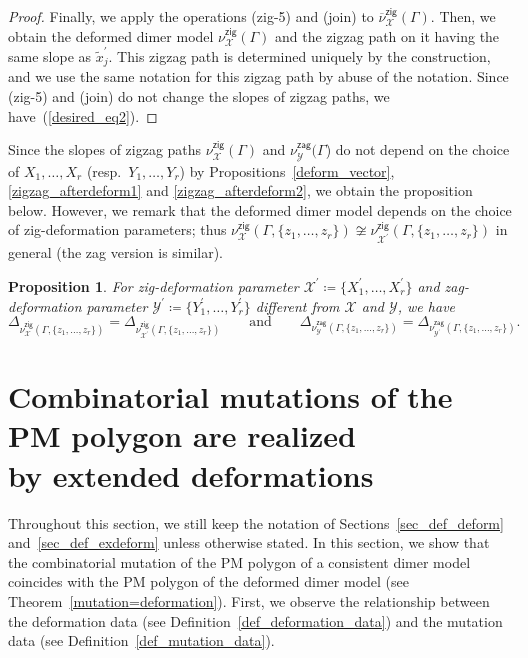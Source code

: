 \documentclass[11pt]{article}
\numberwithin{equation}{section}
\numberwithin{equation}{section}
\numberwithin{figure}{section}
\numberwithin{table}{section}
\newtheorem{Proposition}[Theorem]{Proposition}
 { \theoremstyle{definition}
\newtheorem{Definition}[Theorem]{Definition}
\newtheorem{Note}[Theorem]{Note}
\newtheorem{Example}[Theorem]{Example}
\newtheorem{Remark}[Theorem]{Remark}
\newtheorem{observation}[Theorem]{Observation}
\newtheorem{operation}[Theorem]{Operation}
\newtheorem{setting}[Theorem]{Setting}}
\newcommand{\calX}{\mathcal{X}}
\newcommand{\calY}{\mathcal{Y}}
\newcommand{\zig}{\mathsf{zig}}
\newcommand{\zag}{\mathsf{zag}}
\begin{document}
\begin{proof}
Finally, we apply the operations (zig-5) and (join) to $\overline{\nu}_\calX^\zig(\Gamma)$.
Then, we obtain the deformed dimer model $\nu_\calX^\zig(\Gamma)$ and the zigzag path on it having the same slope as $\widetilde{x}^\prime_j$.
This zigzag path is determined uniquely by the construction, and we use the same notation for this zigzag path by abuse of the notation.
Since (zig-5) and (join) do not change the slopes of zigzag paths, we have~(\ref{desired_eq2}).
\end{proof}

Since the slopes of zigzag paths $\nu^\zig_\calX(\Gamma)$ and $\nu^\zag_\calY(\Gamma$) do not depend on
the choice of $X_1,\dots,X_r$ (resp.\ $Y_1,\dots,Y_r$) by Propositions~\ref{deform_vector}, \ref{zigzag_afterdeform1} and \ref{zigzag_afterdeform2},
we obtain the proposition below.
However, we remark that the deformed dimer model depends on the choice of zig-deformation parameters; thus $\nu^\zig_\calX(\Gamma,\{z_1,\dots,z_r\})\not\cong\nu^\zig_{\calX^\prime}(\Gamma,\{z_1,\dots,z_r\})$ in general (the zag version is similar).

\begin{Proposition}\label{other_weight_PMpolygon}
For zig-deformation parameter $\calX^\prime\coloneqq\{X_1^\prime,\dots,X_r^\prime\}$ and
zag-deformation parameter $\calY^\prime\coloneqq\{Y_1^\prime,\dots,Y_r^\prime\}$ different from $\calX$ and $\calY$, we have
\begin{displaymath}
\Delta_{\nu^\zig_\calX(\Gamma,\{z_1,\dots,z_r\})}=\Delta_{\nu^\zig_{\calX^\prime}(\Gamma,\{z_1,\dots,z_r\})}\qquad\text{and}\qquad \Delta_{\nu^\zag_\calY(\Gamma,\{z_1,\dots,z_r\})}=\Delta_{\nu^\zag_{\calY^\prime}(\Gamma,\{z_1,\dots,z_r\})}.
\end{displaymath}
\end{Proposition}


\section[Combinatorial mutations of the PM polygon are realized\\ by extended deformations]{Combinatorial mutations of the PM polygon are realized\\ by extended deformations}
\label{mutation_vs_deformation}

Throughout this section, we still keep the notation of Sections~\ref{sec_def_deform} and~\ref{sec_def_exdeform} unless otherwise stated.
In this section, we show that the combinatorial mutation of the PM polygon of a consistent dimer model coincides with the PM polygon of the deformed dimer model (see Theorem~\ref{mutation=deformation}).
First, we observe the relationship between the deformation data (see Definition~\ref{def_deformation_data}) and the mutation data (see Definition~\ref{def_mutation_data}).
\end{document}
